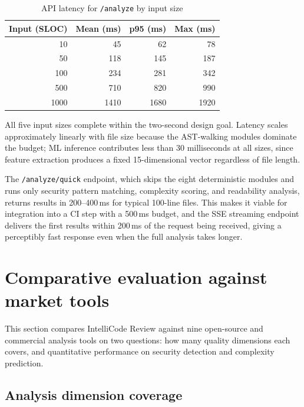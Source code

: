 \documentclass[12pt, oneside]{report}
\begin{document}
\begin{table}[H]
\centering
\caption{API latency for \texttt{/analyze} by input size}
\label{tab:latency}
\begin{tabular}{@{}rrrr@{}}
\toprule
\textbf{Input (SLOC)} & \textbf{Mean (ms)} & \textbf{p95 (ms)} & \textbf{Max (ms)} \\
\midrule
   10 &   45 &   62 &   78 \\
   50 &  118 &  145 &  187 \\
  100 &  234 &  281 &  342 \\
  500 &  710 &  820 &  990 \\
 1000 & 1410 & 1680 & 1920 \\
\bottomrule
\end{tabular}
\end{table}

All five input sizes complete within the two-second design goal. Latency scales approximately linearly with file size because the AST-walking modules dominate the budget; ML inference contributes less than 30 milliseconds at all sizes, since feature extraction produces a fixed 15-dimensional vector regardless of file length.

The \texttt{/analyze/quick} endpoint, which skips the eight deterministic modules and
runs only security pattern matching, complexity scoring, and readability analysis,
returns results in 200--400\,ms for typical 100-line files. This makes it viable for
integration into a CI step with a 500\,ms budget, and the SSE streaming endpoint
delivers the first results within 200\,ms of the request being received, giving a
perceptibly fast response even when the full analysis takes longer.

\section{Comparative evaluation against market tools}
\label{sec:market-comparison}

This section compares IntelliCode Review against nine open-source and commercial analysis
tools on two questions: how many quality dimensions each covers, and quantitative
performance on security detection and complexity prediction.

\subsection{Analysis dimension coverage}
\end{document}
